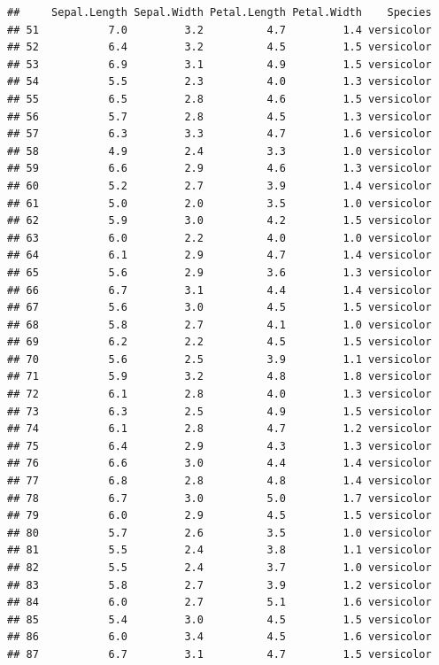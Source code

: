\documentclass[]{article}
\begin{document}
\begin{verbatim}
##     Sepal.Length Sepal.Width Petal.Length Petal.Width    Species
## 51           7.0         3.2          4.7         1.4 versicolor
## 52           6.4         3.2          4.5         1.5 versicolor
## 53           6.9         3.1          4.9         1.5 versicolor
## 54           5.5         2.3          4.0         1.3 versicolor
## 55           6.5         2.8          4.6         1.5 versicolor
## 56           5.7         2.8          4.5         1.3 versicolor
## 57           6.3         3.3          4.7         1.6 versicolor
## 58           4.9         2.4          3.3         1.0 versicolor
## 59           6.6         2.9          4.6         1.3 versicolor
## 60           5.2         2.7          3.9         1.4 versicolor
## 61           5.0         2.0          3.5         1.0 versicolor
## 62           5.9         3.0          4.2         1.5 versicolor
## 63           6.0         2.2          4.0         1.0 versicolor
## 64           6.1         2.9          4.7         1.4 versicolor
## 65           5.6         2.9          3.6         1.3 versicolor
## 66           6.7         3.1          4.4         1.4 versicolor
## 67           5.6         3.0          4.5         1.5 versicolor
## 68           5.8         2.7          4.1         1.0 versicolor
## 69           6.2         2.2          4.5         1.5 versicolor
## 70           5.6         2.5          3.9         1.1 versicolor
## 71           5.9         3.2          4.8         1.8 versicolor
## 72           6.1         2.8          4.0         1.3 versicolor
## 73           6.3         2.5          4.9         1.5 versicolor
## 74           6.1         2.8          4.7         1.2 versicolor
## 75           6.4         2.9          4.3         1.3 versicolor
## 76           6.6         3.0          4.4         1.4 versicolor
## 77           6.8         2.8          4.8         1.4 versicolor
## 78           6.7         3.0          5.0         1.7 versicolor
## 79           6.0         2.9          4.5         1.5 versicolor
## 80           5.7         2.6          3.5         1.0 versicolor
## 81           5.5         2.4          3.8         1.1 versicolor
## 82           5.5         2.4          3.7         1.0 versicolor
## 83           5.8         2.7          3.9         1.2 versicolor
## 84           6.0         2.7          5.1         1.6 versicolor
## 85           5.4         3.0          4.5         1.5 versicolor
## 86           6.0         3.4          4.5         1.6 versicolor
## 87           6.7         3.1          4.7         1.5 versicolor

\end{verbatim}
\end{document}
